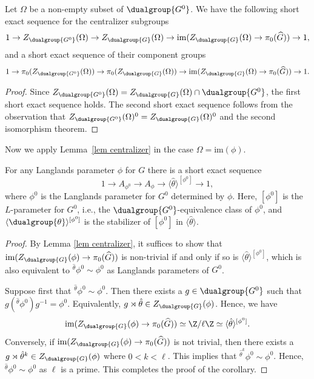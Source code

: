 \documentclass[11pt,letterpaper]{amsart}
\numberwithin{equation}{section}
\begin{document}
\begin{lemma}\label{lem centralizer}
    Let $\Omega$ be a non-empty subset of $\dualgroup{G^0}$. We have the following short exact sequence for the centralizer subgroups
    \begin{align*}
        1 \to Z_{\dualgroup{G^0}}(\Omega) \to Z_{\dualgroup{G}}(\Omega) \to \mathrm{im}(Z_{\dualgroup{G}}(\Omega) \to \pi_0(\widehat{G}) ) \to 1,
    \end{align*}
    and a short exact sequence of their component groups
      \begin{align*}
        1 \to \pi_0(Z_{\dualgroup{G^0}}(\Omega)) \to \pi_0(Z_{\dualgroup{G}}(\Omega)) \to \mathrm{im}(Z_{\dualgroup{G}}(\Omega) \to \pi_0(\widehat{G}) ) \to 1.
    \end{align*}
\end{lemma}
\begin{proof}
    Since $Z_{\dualgroup{G^0}}(\Omega)= Z_{\dualgroup{G}}(\Omega) \cap \dualgroup{G^0}$, the first short exact sequence holds. The second short exact sequence follows from the observation that $Z_{\dualgroup{G^0}}(\Omega)^0= Z_{\dualgroup{G}}(\Omega)^0$ and the second isomorphism theorem.
\end{proof}



Now we apply Lemma~\ref{lem centralizer} in the case $\Omega= \textrm{im}(\phi)$.
\begin{corollary}\label{cor: component group  l pardisc}
For any Langlands parameter $\phi$ for $G$ there is a short exact sequence 
\[
1 \to A_{\phi^0} \to A_{\phi} \to \langle {{\hat\theta}} \rangle^{[\phi^0]} \to 1,
\]
where $\phi^0$ is the Langlands parameter for $G^0$ determined by $\phi$. 
Here, $[\phi^0]$ is the $L$-parameter for $G^0$, i.e., the $\dualgroup{G^0}$-equivalence class of $\phi^0$, and $\langle {\dualgroup{\theta}} \rangle^{[\phi^0]}$ is the stabilizer of $[\phi^0]$ in $\langle {{\hat\theta}} \rangle$. 
\end{corollary}
\begin{proof}
By Lemma \ref{lem centralizer}, it suffices to show that $\textrm{im}(Z_{\dualgroup{G}}(\phi) \to \pi_0(\widehat{G}) )$ is non-trivial if and only if so is $ \langle {{\hat\theta}} \rangle^{[\phi^0]}$, which is also equivalent to ${}^{{\hat\theta}}\phi^0 \sim \phi^0$ as Langlands parameters of $G^0$.

Suppose first that ${}^{{\hat\theta}}\phi^0 \sim \phi^0$. Then there exists a $g \in \dualgroup{G^0}$ such that $ g ({}^{\hat{\theta}}\phi^0 )g^{-1}= \phi^0$. Equivalently, $g \rtimes \hat{\theta} \in Z_{\dualgroup{G}}(\phi)$. Hence, we have 
\[\textrm{im}(Z_{\dualgroup{G}}(\phi) \to \pi_0(\widehat{G})) \simeq \Z/\ell\Z \simeq \langle {{\hat\theta}} \rangle^{[\phi^0]}.\]  Conversely, if $\textrm{im}(Z_{\dualgroup{G}}(\phi) \to \pi_0(\widehat{G}))$ is not trivial, then there exists a $g\rtimes \hat{\theta}^k \in Z_{\dualgroup{G}}(\phi)$ where $0<k <\ell$. This implies that ${}^{\hat{\theta}^k} \phi^0 \sim \phi^0 $. Hence, ${}^{\hat{\theta}} \phi^0 \sim \phi^0 $ as $\ell$ is a prime. This completes the proof of the corollary.
\end{proof}
\end{document}
